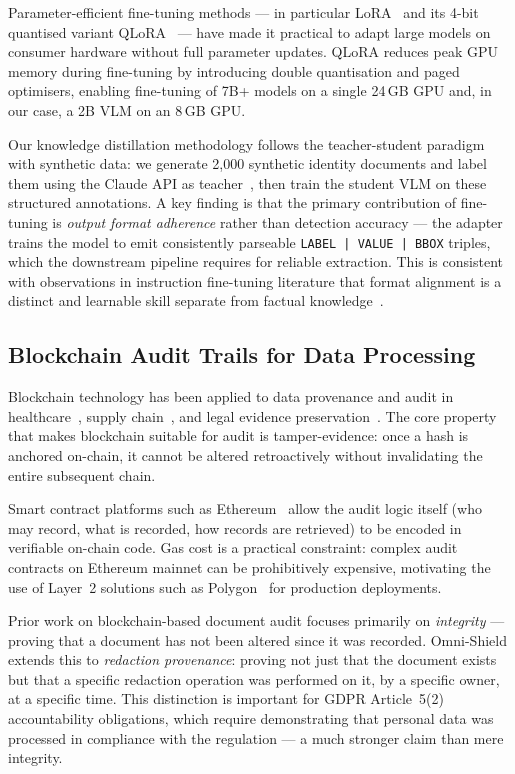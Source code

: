 \documentclass[conference]{IEEEtran}
\begin{document}
Parameter-efficient fine-tuning methods --- in
particular LoRA~\cite{hu2022lora} and its
4-bit quantised variant QLoRA~\cite{dettmers2023qlora}
--- have made it practical to adapt large models on
consumer hardware without full parameter updates.
QLoRA reduces peak GPU memory during fine-tuning by
introducing double quantisation and paged optimisers,
enabling fine-tuning of 7B+ models on a single 24\,GB
GPU and, in our case, a 2B VLM on an 8\,GB GPU.

Our knowledge distillation methodology follows the
teacher-student paradigm with synthetic data:
we generate 2,000 synthetic identity documents and
label them using the Claude API as teacher~\cite{anthropic2024},
then train the student VLM on these structured
annotations.
A key finding is that the primary contribution of
fine-tuning is \emph{output format adherence} rather
than detection accuracy --- the adapter trains the
model to emit consistently parseable
\texttt{LABEL\,|\,VALUE\,|\,BBOX} triples, which the
downstream pipeline requires for reliable extraction.
This is consistent with observations in instruction
fine-tuning literature that format alignment is a
distinct and learnable skill separate from factual
knowledge~\cite{ouyang2022instructgpt}.

\subsection{Blockchain Audit Trails for Data Processing}

Blockchain technology has been applied to data
provenance and audit in healthcare~\cite{xia2017medshare},
supply chain~\cite{Casino2019}, and
legal evidence preservation~\cite{zhu2019blockchain}.
The core property that makes blockchain suitable for
audit is tamper-evidence: once a hash is anchored
on-chain, it cannot be altered retroactively without
invalidating the entire subsequent chain.

Smart contract platforms such as
Ethereum~\cite{buterin2014ethereum} allow the audit
logic itself (who may record, what is recorded, how
records are retrieved) to be encoded in verifiable
on-chain code.
Gas cost is a practical constraint: complex audit
contracts on Ethereum mainnet can be prohibitively
expensive, motivating the use of Layer~2 solutions such
as Polygon~\cite{polygon2021} for production deployments.

Prior work on blockchain-based document audit focuses
primarily on \emph{integrity} --- proving that a
document has not been altered since it was recorded.
Omni-Shield extends this to \emph{redaction
provenance}: proving not just that the document exists
but that a specific redaction operation was performed
on it, by a specific owner, at a specific time.
This distinction is important for GDPR Article~5(2)
accountability obligations, which require demonstrating
that personal data was processed in compliance with
the regulation --- a much stronger claim than mere
integrity.
\end{document}
